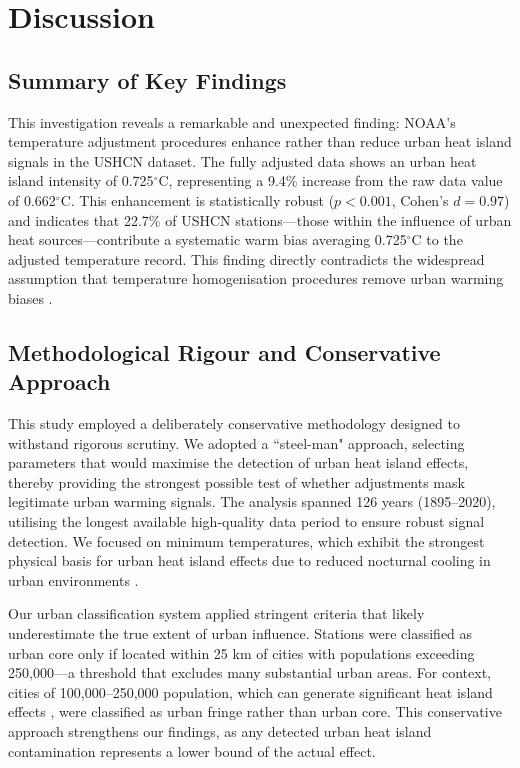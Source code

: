 \documentclass[11pt, a4paper]{article}
\begin{document}
\section{Discussion}

\subsection{Summary of Key Findings}

This investigation reveals a remarkable and unexpected finding: NOAA's temperature adjustment procedures enhance rather than reduce urban heat island signals in the USHCN dataset. The fully adjusted data shows an urban heat island intensity of 0.725$^\circ$C, representing a 9.4\% increase from the raw data value of 0.662$^\circ$C. This enhancement is statistically robust ($p < 0.001$, Cohen's $d = 0.97$) and indicates that 22.7\% of USHCN stations—those within the influence of urban heat sources—contribute a systematic warm bias averaging 0.725$^\circ$C to the adjusted temperature record. This finding directly contradicts the widespread assumption that temperature homogenisation procedures remove urban warming biases \parencite{peterson2006examination,hausfather2013quantifying}.

\subsection{Methodological Rigour and Conservative Approach}

This study employed a deliberately conservative methodology designed to withstand rigorous scrutiny. We adopted a ``steel-man" approach, selecting parameters that would maximise the detection of urban heat island effects, thereby providing the strongest possible test of whether adjustments mask legitimate urban warming signals. The analysis spanned 126 years (1895--2020), utilising the longest available high-quality data period to ensure robust signal detection. We focused on minimum temperatures, which exhibit the strongest physical basis for urban heat island effects due to reduced nocturnal cooling in urban environments \parencite{oke1987boundary}.

Our urban classification system applied stringent criteria that likely underestimate the true extent of urban influence. Stations were classified as urban core only if located within 25 km of cities with populations exceeding 250,000—a threshold that excludes many substantial urban areas. For context, cities of 100,000--250,000 population, which can generate significant heat island effects \parencite{oke1973city}, were classified as urban fringe rather than urban core. This conservative approach strengthens our findings, as any detected urban heat island contamination represents a lower bound of the actual effect.
\end{document}
